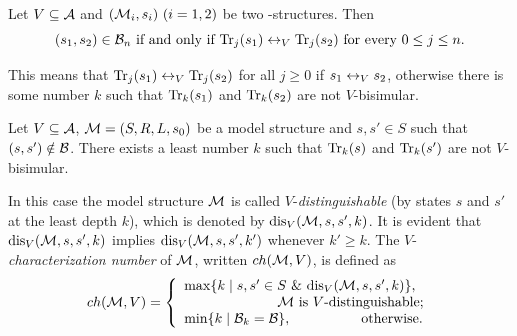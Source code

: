 \documentclass{article}
\begin{document}
\begin{proposition}\label{B_to_T}
  Let $V\subseteq\cal A$ and $({\cal M}_i,s_i)~(i=1,2)$ be two \MPK-structures.
  Then
  \[(s_1,s_2)\in{\cal B}_n\mbox{ if and only if }
  \textrm{Tr}_j(s_1)\leftrightarrow_V\textrm{Tr}_j(s_2)\mbox{ for every $0\le j\le n$}.\]
\end{proposition}
%
%
This means that $\textrm{Tr}_j(s_1) \leftrightarrow_V \textrm{Tr}_j(s_2)$ for all $j \geq 0$ if $s_1 \leftrightarrow_V s_2$, otherwise there is some number $k$ such that $\textrm{Tr}_k(s_1)$ and $\textrm{Tr}_k(s_2)$ are not $V$-bisimular.

\begin{proposition}
  Let $V\subseteq {\cal A}$, ${\cal M} =(S,R,L,s_0)$ be a model structure and $s,s'\in S$
  such that $(s,s')\notin \cal B$.
  There exists a least number $k$ such that
  $\textrm{Tr}_k(s)$ and $\textrm{Tr}_k(s')$ are not $V$-bisimular.
\end{proposition}
In this case the  model structure ${\cal M}$ is called $V$-{\em distinguishable} (by
states $s$ and $s'$ at the least depth $k$), which is denoted by $\textrm{dis}_V({\cal M},s,s',k)$.
It is evident that
$\textrm{dis}_V({\cal M},s,s',k)$ implies $\textrm{dis}_V({\cal M},s,s',k')$ whenever $k'\ge k$.
The $V$-{\em characterization number}
of ${\cal M}$, written $ch({\cal M},V)$, is defined as
\[ch({\cal M},V)=
\left\{
  \begin{array}{ll}
    \max\{k\mid s,s'\in S\ \&\ \textrm{dis}_V({\cal M},s,s',k)\},\\
         \ \ \qquad \qquad \qquad \hbox{${\cal M}$ is $V$-distinguishable;} \\
    \min\{k\mid {\cal B}_{k}={\cal B}\}, \ \ \ \qquad \qquad \hbox{otherwise.}
  \end{array}
\right.
\]
\end{document}
